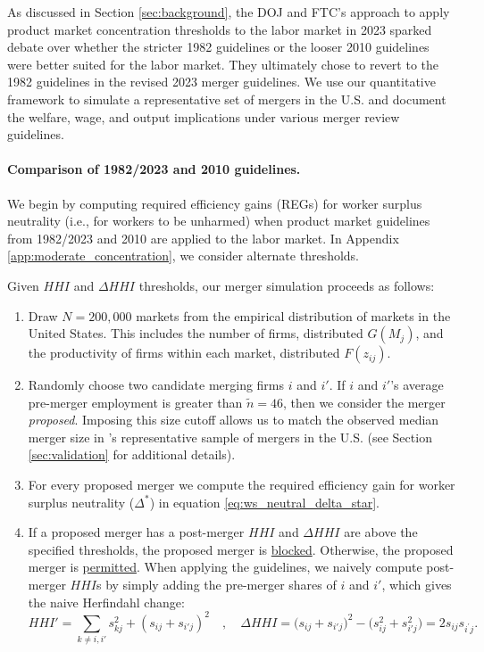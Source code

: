 \documentclass[12pt]{article}
\theoremstyle{prop}
\begin{document}
As discussed in Section  \ref{sec:background}, the DOJ and FTC's approach to apply product market concentration thresholds to the labor market in 2023 sparked debate over whether the stricter 1982 guidelines or the looser 2010 guidelines were better suited for the labor market. They ultimately chose to revert to the 1982 guidelines in the revised 2023 merger guidelines. 
We use our quantitative framework to simulate a representative set of mergers in the U.S. and document the welfare, wage, and output implications under various merger review guidelines. 

\paragraph{Comparison of 1982/2023 and 2010 guidelines.} 
We begin by computing required efficiency gains (REGs) for worker surplus neutrality (i.e., for workers to be unharmed) when product market guidelines from 1982/2023 and 2010 are applied to the labor market. 
In Appendix \ref{app:moderate_concentration}, we consider alternate thresholds. 
 
Given $HHI$ and $\Delta HHI$ thresholds, our merger simulation proceeds as follows:
{\small 
\begin{enumerate}
	\item Draw $N=200,000$ markets from the empirical distribution of markets in the United States. This includes the number of firms, distributed $G(M_j)$, and the productivity of firms within each market, distributed $F(z_{ij})$.\vspace*{-.2cm}
	\item Randomly choose two candidate merging firms $i$ and $i'$. If $i$ and $i'$'s average pre-merger employment is greater than $\tilde{n}=46$, then we consider the merger \emph{proposed}. Imposing this size cutoff allows us to match the observed median merger size in \citet{Arnold}'s representative sample of mergers in the U.S. (see Section \ref{sec:validation} for additional details).\vspace*{-.2cm}   
	\item For every proposed merger we compute the required efficiency gain for worker surplus neutrality ($\Delta^{*}$) in equation \eqref{eq:ws_neutral_delta_star}.  \vspace*{-.2cm}  
 \item If a proposed merger has a post-merger $HHI$ and $\Delta HHI$ are above the specified thresholds, the proposed merger is \underline{blocked}. Otherwise, the proposed merger is \underline{permitted}. When applying the guidelines, we naively compute  post-merger $HHI$s by simply adding the pre-merger shares of $i$ and $i'$, which gives the naive Herfindahl change:
 $$HHI'=\sum_{k\neq i,i'} s_{kj}^2+(s_{ij}+s_{i'j})^2
 \quad,\quad
 \Delta HHI=  \Big(s_{ij}+s_{i'j}\Big)^2 - \Big(s_{ij}^2+s_{i'j}^2\Big) = 2s_{ij}s_{i^\prime j}.$$   
\end{enumerate}}
\end{document}
